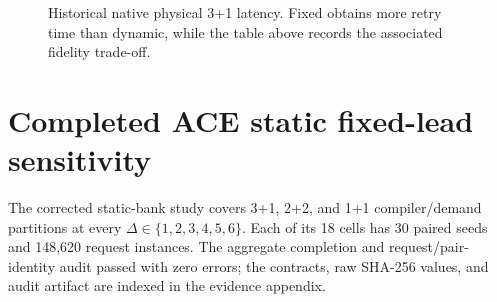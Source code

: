 \documentclass[11pt,a4paper]{report}
\begin{document}
\begin{figure}[htbp]
\centering
{}
\caption{Historical native physical 3+1 latency. Fixed obtains more retry
time than dynamic, while the table above records the associated fidelity
trade-off.}
\label{fig:historical-native-static-latency}
\end{figure}
\FloatBarrier

\section{Completed ACE static fixed-lead sensitivity}\label{sec:ace-static-fixed-leads}
The corrected static-bank study covers 3+1, 2+2, and 1+1
compiler/demand partitions at every $\Delta\in\{1,2,3,4,5,6\}$. Each of its
18 cells has 30 paired seeds and 148,620 request instances. The aggregate
completion and request/pair-identity audit passed with zero errors; the
contracts, raw SHA-256 values, and audit artifact are indexed in the evidence
appendix.
\end{document}
